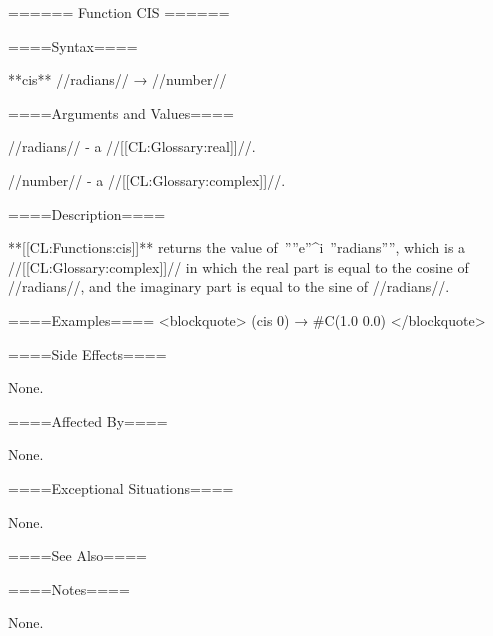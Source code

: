 ====== Function CIS ======

====Syntax====

**cis** //radians// → //number//

====Arguments and Values====

//radians// - a //[[CL:Glossary:real]]//.

//number// - a //[[CL:Glossary:complex]]//.

====Description====

**[[CL:Functions:cis]]** returns the value of~''''e''^{i\cdot\ ''radians''}'', which is a //[[CL:Glossary:complex]]// in which the real part is equal to the cosine of //radians//, and the imaginary part is equal to the sine of //radians//.

====Examples==== <blockquote> (cis 0) → #C(1.0 0.0) </blockquote>

====Side Effects====

None.

====Affected By====

None.

====Exceptional Situations====

None.

====See Also====

{\secref\FloatSubstitutability}

====Notes====

None.

